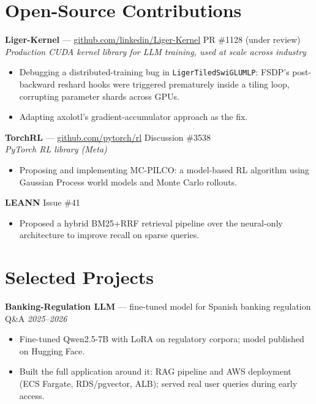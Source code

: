 \documentclass[10pt,a4paper]{article}
\begin{document}
\section{Open-Source Contributions}

\noindent
\textbf{Liger-Kernel} --- \href{https://github.com/linkedin/Liger-Kernel}{github.com/linkedin/Liger-Kernel} \hfill PR \#1128 (under review)\\
\textit{Production CUDA kernel library for LLM training, used at scale across industry}
\begin{itemize}
  \item Debugging a distributed-training bug in \texttt{LigerTiledSwiGLUMLP}: FSDP's post-backward reshard hooks were triggered prematurely inside a tiling loop, corrupting parameter shards across GPUs.
  \item Adapting axolotl's gradient-accumulator approach as the fix.
\end{itemize}

\vspace{4pt}
\noindent
\textbf{TorchRL} --- \href{https://github.com/pytorch/rl}{github.com/pytorch/rl} \hfill Discussion \#3538\\
\textit{PyTorch RL library (Meta)}
\begin{itemize}
  \item Proposing and implementing MC-PILCO: a model-based RL algorithm using Gaussian Process world models and Monte Carlo rollouts.
\end{itemize}

\vspace{4pt}
\noindent
\textbf{LEANN} \hfill Issue \#41
\begin{itemize}
  \item Proposed a hybrid BM25+RRF retrieval pipeline over the neural-only architecture to improve recall on sparse queries.
\end{itemize}

\section{Selected Projects}

\noindent
\textbf{Banking-Regulation LLM} --- fine-tuned model for Spanish banking regulation Q\&A \hfill \textit{2025--2026}
\begin{itemize}
  \item Fine-tuned Qwen2.5-7B with LoRA on regulatory corpora; model published on Hugging Face. %
  \item Built the full application around it: RAG pipeline and AWS deployment (ECS Fargate, RDS/pgvector, ALB); served real user queries during early access.
\end{itemize}
\end{document}
